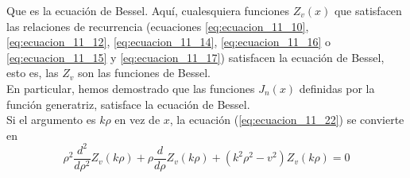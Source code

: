 Que es la ecuación de Bessel. Aquí, cualesquiera funciones $Z_{v}(x)$ que satisfacen las relaciones de recurrencia (ecuaciones \ref{eq:ecuacion_11_10}, \ref{eq:ecuacion_11_12}, \ref{eq:ecuacion_11_14}, \ref{eq:ecuacion_11_16} o \ref{eq:ecuacion_11_15} y \ref{eq:ecuacion_11_17}) satisfacen la ecuación de Bessel, esto es, las $Z_{v}$ son las funciones de Bessel.
\\
En particular, hemos demostrado que las funciones $J_{n}(x)$ definidas por la función generatriz, satisface la ecuación de Bessel.
\\
Si el argumento es $k \rho$ en vez de $x$, la ecuación (\ref{eq:ecuacion_11_22}) se convierte en
\begin{equation}
\rho^{2} \dfrac{d^{2}}{d \rho^{2}} Z_{v} (k \rho) + \rho \dfrac{d}{d \rho} Z_{v} (k \rho) + (k^{2} \rho^{2} - v^{2}) Z_{v} (k \rho) = 0
\label{eq:ecuacion_11_22a}
\end{equation}
